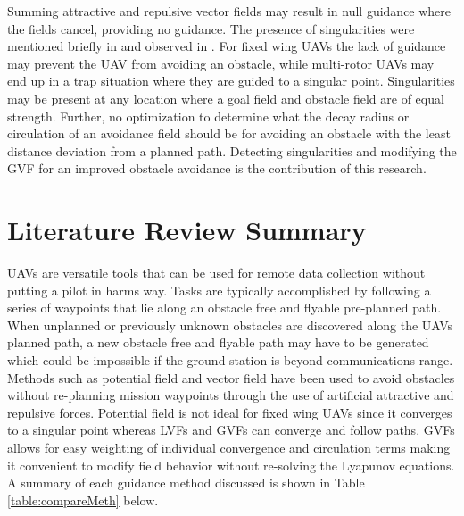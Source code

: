 \documentclass[numbered,pdftex]{ohio-etd}
\begin{document}
Summing attractive and repulsive vector fields may result in null guidance where the fields cancel, providing no guidance. The presence of singularities were mentioned briefly in \cite{nelson_cooperative_2005} and observed in \cite{panagou_motion_2014}. For fixed wing UAVs the lack of guidance may prevent the UAV from avoiding an obstacle, while multi-rotor UAVs may end up in a trap situation where they are guided to a singular point. Singularities may be present at any location where a goal field and obstacle field are of equal strength. Further, no optimization to determine what the decay radius or circulation of an avoidance field should be for avoiding an obstacle with the least distance deviation from a planned path. Detecting singularities and modifying the GVF for an improved obstacle avoidance is the contribution of this research.



\section{Literature Review Summary}
UAVs are versatile tools that can be used for remote data collection without putting a pilot in harms way. Tasks are typically accomplished by following a series of waypoints that lie along an obstacle free and flyable pre-planned path. When unplanned or previously unknown obstacles are discovered along the UAVs planned path, a new obstacle free and flyable path may have to be generated which could be impossible if the ground station is beyond communications range. Methods such as potential field and vector field have been used to avoid obstacles without re-planning mission waypoints through the use of artificial attractive and repulsive forces. Potential field is not ideal for fixed wing UAVs since it converges to a singular point whereas LVFs and GVFs can converge and follow paths. GVFs allows for easy weighting of individual convergence and circulation terms making it convenient to modify field behavior without re-solving the Lyapunov equations. A summary of each guidance method discussed is shown in Table \ref{table:compareMeth} below.
\end{document}
